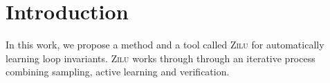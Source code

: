 
\section{Introduction}
In this work, we propose a method and a tool called \textsc{Zilu} for automatically learning loop invariants. \textsc{Zilu} works through through an iterative process combining sampling, active learning and verification.
